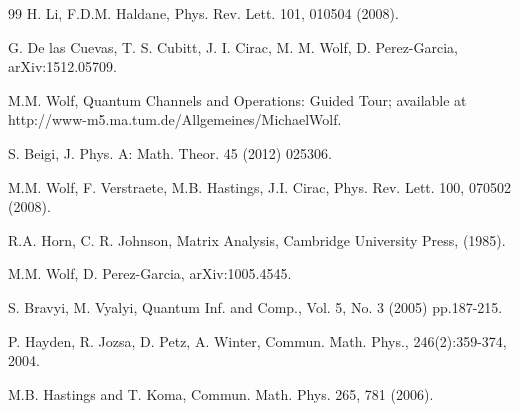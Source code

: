 \documentclass{elsarticle}
\begin{document}
\begin{thebibliography}{99}
H. Li, F.D.M. Haldane,
Phys. Rev. Lett. 101,  010504 (2008).

G. De las Cuevas, T. S. Cubitt, J. I. Cirac, M. M. Wolf, D. Perez-Garcia,
arXiv:1512.05709.

M.M. Wolf,
Quantum Channels and Operations: Guided Tour; available at http://www-m5.ma.tum.de/Allgemeines/MichaelWolf.

S. Beigi,
J. Phys. A: Math. Theor. 45 (2012) 025306.

M.M. Wolf, F. Verstraete, M.B. Hastings, J.I. Cirac,
Phys. Rev. Lett. 100, 070502 (2008).

R.A. Horn, C. R. Johnson,
Matrix Analysis, Cambridge University Press,  (1985).

M.M. Wolf, D. Perez-Garcia,
arXiv:1005.4545.


S. Bravyi, M. Vyalyi,
Quantum Inf. and Comp., Vol. 5, No. 3 (2005) pp.187-215.

P. Hayden, R. Jozsa, D. Petz,  A. Winter,
Commun. Math. Phys., 246(2):359-374, 2004.

M.B. Hastings and T. Koma, 
Commun. Math. Phys. {265}, 781  (2006).

\end{thebibliography}
\end{document}
